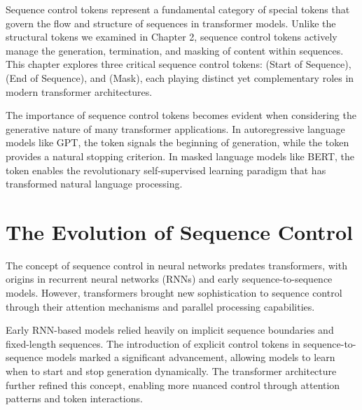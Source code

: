 
Sequence control tokens represent a fundamental category of special tokens that govern the flow and structure of sequences in transformer models. Unlike the structural tokens we examined in Chapter 2, sequence control tokens actively manage the generation, termination, and masking of content within sequences. This chapter explores three critical sequence control tokens: \sos{} (Start of Sequence), \eos{} (End of Sequence), and \mask{} (Mask), each playing distinct yet complementary roles in modern transformer architectures.
\begin{comment}
Feedback: The distinction between "structural tokens" and "sequence control tokens" is a good one. To make it even sharper, you could use an analogy. For example: "If the structural tokens from Chapter 2 ([CLS], [SEP]) are like the punctuation that organizes a finished document, the sequence control tokens in this chapter are like the commands given to the author: 'Start writing,' 'Stop writing,' and 'Fill in this blank.' They are active instructions, not just passive organizers."
\end{comment}

The importance of sequence control tokens becomes evident when considering the generative nature of many transformer applications. In autoregressive language models like GPT, the \sos{} token signals the beginning of generation, while the \eos{} token provides a natural stopping criterion. In masked language models like BERT, the \mask{} token enables the revolutionary self-supervised learning paradigm that has transformed natural language processing.

\section{The Evolution of Sequence Control}

The concept of sequence control in neural networks predates transformers, with origins in recurrent neural networks (RNNs) and early sequence-to-sequence models. However, transformers brought new sophistication to sequence control through their attention mechanisms and parallel processing capabilities.

Early RNN-based models relied heavily on implicit sequence boundaries and fixed-length sequences. The introduction of explicit control tokens in sequence-to-sequence models marked a significant advancement, allowing models to learn when to start and stop generation dynamically. The transformer architecture further refined this concept, enabling more nuanced control through attention patterns and token interactions.
\begin{comment}
Feedback: This is a good historical overview. To make the "transformer" advantage more concrete, you could add a sentence explaining *how* attention made a difference. For example: "Unlike RNNs, where the influence of a start token could fade over long sequences, the transformer's attention mechanism allows control tokens like [SOS] and [EOS] to directly influence every other token in the sequence, regardless of distance, leading to more robust and precise control."
\end{comment}

